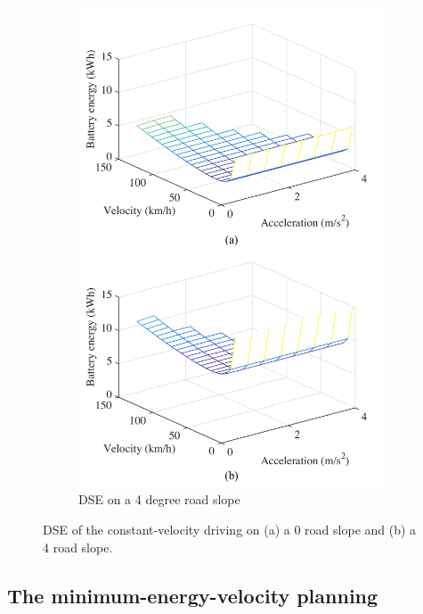 \documentclass{IEEEtran}
\begin{document}
\begin{figure}
\begin{subfigure}{0.5\textwidth}
	\includegraphics[width=\hsize]{Figures/Design_space_exploration_bottom.pdf}
	\caption{DSE on a 4 degree road slope}
	\label{fig:DSE_4_slope}
	\end{subfigure}
\caption{DSE of  the constant-velocity driving on (a) a 0 road slope and (b) a 4 road slope.}
\end{figure}



\subsection{The minimum-energy-velocity planning} \label{subsec:variable drive}
\end{document}
